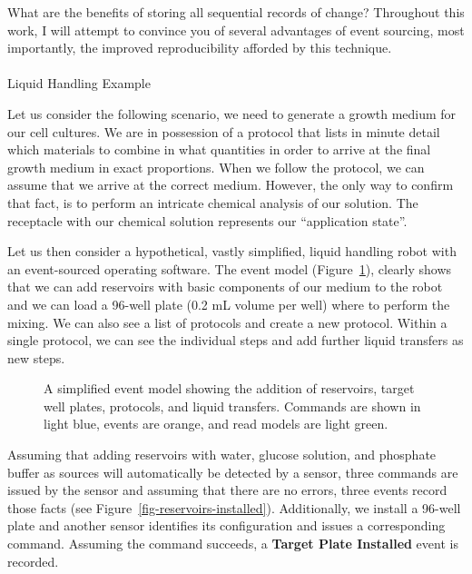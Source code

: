 \documentclass[
  a4paper,
]{scrartcl}
\makeatletter
\let\oldparagraph\paragraph
\renewcommand{\paragraph}{
    \@ifstar
      \xxxParagraphStar
      \xxxParagraphNoStar
  }
\newcommand{\xxxParagraphStar}[1]{\oldparagraph*{#1}\mbox{}}
\newcommand{\xxxParagraphNoStar}[1]{\oldparagraph{#1}\mbox{}}
\newcommand*\pandocbounded[1]{%
  \sbox\pandoc@box{#1}%
  \Gscale@div\@tempa{\textheight}{\dimexpr\ht\pandoc@box+\dp\pandoc@box\relax}%
  \Gscale@div\@tempb{\linewidth}{\wd\pandoc@box}%
  \ifdim\@tempb\p@<\@tempa\p@\let\@tempa\@tempb\fi%
  \ifdim\@tempa\p@<\p@\scalebox{\@tempa}{\usebox\pandoc@box}%
  \else\usebox{\pandoc@box}%
  \fi%
}
\makeatother
\begin{document}
What are the benefits of storing all sequential records of change?
Throughout this work, I will attempt to convince you of several
advantages of event sourcing, most importantly, the improved
reproducibility afforded by this technique.

\paragraph{Liquid Handling Example}\label{liquid-handling-example}

Let us consider the following scenario, we need to generate a growth
medium for our cell cultures. We are in possession of a protocol that
lists in minute detail which materials to combine in what quantities in
order to arrive at the final growth medium in exact proportions. When we
follow the protocol, we can assume that we arrive at the correct medium.
However, the only way to confirm that fact, is to perform an intricate
chemical analysis of our solution. The receptacle with our chemical
solution represents our ``application state''.

Let us then consider a hypothetical, vastly simplified, liquid handling
robot with an event-sourced operating software. The event model
(Figure~\ref{fig-liquid-handling}), clearly shows that we can add
reservoirs with basic components of our medium to the robot and we can
load a 96-well plate (0.2 mL volume per well) where to perform the
mixing. We can also see a list of protocols and create a new protocol.
Within a single protocol, we can see the individual steps and add
further liquid transfers as new steps.

\begin{figure}

\centering{

\pandocbounded{\texttt{[image: liquid\_handling.png]}}

}

\caption{\label{fig-liquid-handling}A simplified event model showing the
addition of reservoirs, target well plates, protocols, and liquid
transfers. Commands are shown in light blue, events are orange, and read
models are light green.}

\end{figure}%

Assuming that adding reservoirs with water, glucose solution, and
phosphate buffer as sources will automatically be detected by a sensor,
three commands are issued by the sensor and assuming that there are no
errors, three events record those facts (see
Figure~\ref{fig-reservoirs-installed}). Additionally, we install a
96-well plate and another sensor identifies its configuration and issues
a corresponding command. Assuming the command succeeds, a \textbf{Target
Plate Installed} event is recorded.
\end{document}
